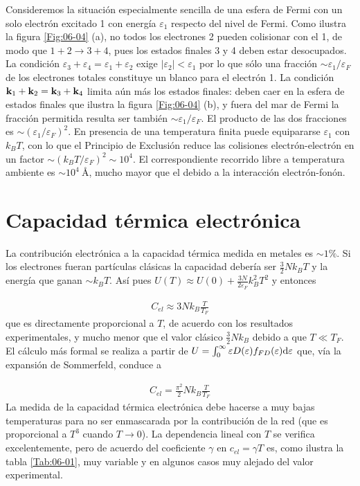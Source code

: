 Consideremos la situación especialmente sencilla de una esfera de Fermi con un solo electrón excitado 1 con energía $\varepsilon_1$ respecto del nivel de Fermi. Como ilustra la figura \ref{Fig:06-04} (a), no todos los electrones 2 pueden colisionar con el 1, de modo que $1+2\rightarrow3+4$, pues los estados finales 3 y 4 deben estar desocupados. La condición $\varepsilon_3 + \varepsilon_4 = \varepsilon_1 + \varepsilon_2$ exige $|\varepsilon_2|<\varepsilon_1$ por lo que sólo una fracción $\sim \varepsilon_1 / \varepsilon_F$ de los electrones totales constituye un blanco para el electrón 1. La condición $\mathbf{k}_1 + \mathbf{k}_2 = \mathbf{k}_3 + \mathbf{k}_4$ limita aún más los estados finales: deben caer en la esfera de estados finales que ilustra la figura \ref{Fig:06-04} (b), y fuera del mar de Fermi la fracción permitida resulta ser también $\sim \varepsilon_1 / \varepsilon_F$. El producto de las dos fracciones es $\sim (\varepsilon_1/\varepsilon_F)^2$. 
En presencia de una temperatura finita puede equipararse $\varepsilon_1$ con $k_BT$, con lo que el Principio de Exclusión reduce las colisiones electrón-electrón en un factor $\sim (k_BT/\varepsilon_F)^2 \sim 10^4$. El correspondiente recorrido libre a temperatura ambiente es $\sim 10^4 \ \unit{\angstrom}$, mucho mayor que el debido a la interacción electrón-fonón.

\section{Capacidad térmica electrónica}

La contribución electrónica a la capacidad térmica medida en metales es $\sim 1\%$. Si los electrones fueran partículas clásicas la capacidad debería ser $\frac{3}{2} N k_BT$ y la energía que ganan $\sim k_B T$. Así pues $U(T) \approx U(0)+\frac{3N}{2\varepsilon_F} k_B^2 T^2$ y entonces

\begin{eqnarray}
	C_{el} \approx 3 N k_B \frac{T}{T_F}
\end{eqnarray}
que es directamente proporcional a $T$, de acuerdo con los resultados experimentales, y mucho menor que el valor clásico $\frac{3}{2} Nk_B$  debido a que $T\ll T_F$. El cálculo más formal se realiza a partir de $U=\int_{0}^{\infty} \varepsilon D(\varepsilon) f_{FD} (\varepsilon) \mathrm{d} \varepsilon$ que, vía la expansión de Sommerfeld, conduce a 

\begin{eqnarray}
	C_{el} = \frac{\pi^2}{2} N k_B \frac{T}{T_F}  \label{Ec:06-02-02}
\end{eqnarray}
La medida de la capacidad térmica electrónica debe hacerse a muy bajas temperaturas para no ser enmascarada por la contribución de la red (que es proporcional a $T^3$ cuando $T\rightarrow 0$). La dependencia lineal con $T$ se verifica excelentemente, pero de acuerdo del coeficiente $\gamma$ en $c_{el} = \gamma T$ es, como ilustra la tabla \ref{Tab:06-01}, muy variable y en algunos casos muy alejado del valor experimental.

